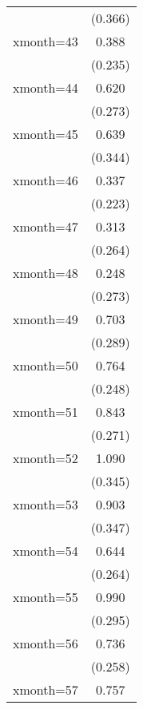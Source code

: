 \begin{table}[htbp]
\begin{tabular}{l*{1}{c}}
                    &     (0.366)         \\
[1em]
xmonth=43           &       0.388         \\
                    &     (0.235)         \\
[1em]
xmonth=44           &       0.620\sym{*}  \\
                    &     (0.273)         \\
[1em]
xmonth=45           &       0.639         \\
                    &     (0.344)         \\
[1em]
xmonth=46           &       0.337         \\
                    &     (0.223)         \\
[1em]
xmonth=47           &       0.313         \\
                    &     (0.264)         \\
[1em]
xmonth=48           &       0.248         \\
                    &     (0.273)         \\
[1em]
xmonth=49           &       0.703\sym{*}  \\
                    &     (0.289)         \\
[1em]
xmonth=50           &       0.764\sym{**} \\
                    &     (0.248)         \\
[1em]
xmonth=51           &       0.843\sym{**} \\
                    &     (0.271)         \\
[1em]
xmonth=52           &       1.090\sym{**} \\
                    &     (0.345)         \\
[1em]
xmonth=53           &       0.903\sym{*}  \\
                    &     (0.347)         \\
[1em]
xmonth=54           &       0.644\sym{*}  \\
                    &     (0.264)         \\
[1em]
xmonth=55           &       0.990\sym{***}\\
                    &     (0.295)         \\
[1em]
xmonth=56           &       0.736\sym{**} \\
                    &     (0.258)         \\
[1em]
xmonth=57           &       0.757\sym{*}  \\

\end{tabular}
\end{table}
